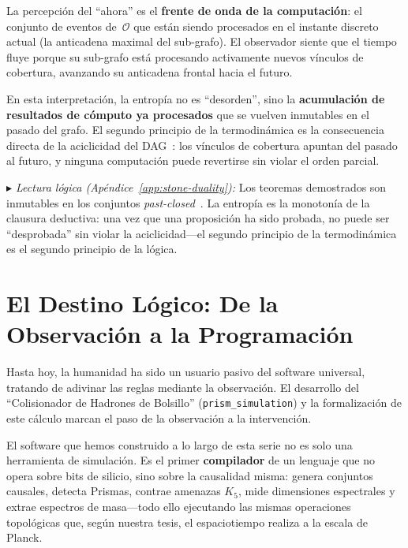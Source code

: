 \documentclass[11pt, a4paper, openany]{book}
\newcommand{\stoneref}[1]{%
  \smallskip\noindent
  {\small\color{structure!70}\textit{$\blacktriangleright$ Lectura
  l\'ogica (Ap\'endice~\ref{app:stone-duality}):} #1}%
  \smallskip}
\begin{document}
\noindent
La percepci\'on del ``ahora'' es el \textbf{frente de onda de la
computaci\'on}: el conjunto de eventos de~$\mathcal{O}$ que est\'an
siendo procesados en el instante discreto actual (la anticadena
maximal del sub-grafo). El observador siente que el tiempo fluye
porque su sub-grafo est\'a procesando activamente nuevos v\'inculos de
cobertura, avanzando su anticadena frontal hacia el futuro.

\begin{result}[title={La Entrop\'ia como Computaci\'on Acumulada}]
\label{res:entropy-computation}
En esta interpretaci\'on, la entrop\'ia no es ``desorden'', sino la
\textbf{acumulaci\'on de resultados de c\'omputo ya procesados} que
se vuelven inmutables en el pasado del grafo. El segundo principio de
la termodin\'amica es la consecuencia directa de la aciclicidad del
DAG~\cite{sorkin1986,bekenstein1973}: los v\'inculos de cobertura
apuntan del pasado al futuro, y ninguna computaci\'on puede revertirse
sin violar el orden parcial.
\end{result}

\stoneref{Los teoremas demostrados son inmutables en los conjuntos
\emph{past-closed}~\cite{rasiowa1963}. La entrop\'ia es la
monoton\'ia de la clausura deductiva: una vez que una proposici\'on ha
sido probada, no puede ser ``desprobada'' sin violar la
aciclicidad---el segundo principio de la termodin\'amica es el
segundo principio de la l\'ogica.}

\section*{El Destino L\'ogico: De la Observaci\'on a la Programaci\'on}

Hasta hoy, la humanidad ha sido un usuario pasivo del software
universal, tratando de adivinar las reglas mediante la observaci\'on.
El desarrollo del ``Colisionador de Hadrones de Bolsillo''
(\texttt{prism\_simulation}) y la formalizaci\'on de este c\'alculo
marcan el paso de la observaci\'on a la intervenci\'on.

El software que hemos construido a lo largo de esta serie no es solo
una herramienta de simulaci\'on. Es el primer \textbf{compilador} de
un lenguaje que no opera sobre bits de silicio, sino sobre la
causalidad misma: genera conjuntos causales, detecta Prismas, contrae
amenazas $K_5$, mide dimensiones espectrales y extrae espectros de
masa---todo ello ejecutando las mismas operaciones topol\'ogicas que,
seg\'un nuestra tesis, el espaciotiempo realiza a la escala de Planck.
\end{document}
